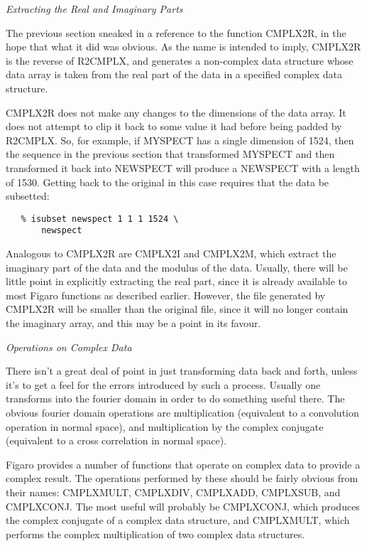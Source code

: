 \goodbreak
\vspace{12pt}
{\it Extracting the Real and Imaginary Parts}

The previous section sneaked in a reference to the function CMPLX2R,
in the hope that what it did was obvious.  As the name is intended to imply,
CMPLX2R is the reverse of R2CMPLX, and generates a non-complex data structure
whose data array is taken from the real part of the data in a specified
complex data structure.

CMPLX2R does not make any changes to the dimensions of the data
array.  It does not attempt to clip it back to some value it had before
being padded by R2CMPLX.  So, for
example, if MYSPECT has a single dimension of 1524, then the sequence
in the previous section that transformed MYSPECT and then transformed it
back into NEWSPECT will produce a NEWSPECT with a length of 1530.
Getting back to the original in this case requires that the data be subsetted:

\begin{verbatim}
   % isubset newspect 1 1 1 1524 \
       newspect
\end{verbatim}

Analogous to CMPLX2R are CMPLX2I and CMPLX2M, which extract the
imaginary part of the data and the modulus of the data.  Usually, there
will be little point in explicitly extracting the real part, since it is
already available to most Figaro functions as described earlier.  However,
the file generated by CMPLX2R will be smaller than the original file, since
it will no longer contain the imaginary array, and this may be
a point in its favour.


\goodbreak
\vspace{12pt}
{\it Operations on Complex Data}

There isn't a great deal of point in just transforming data back and
forth, unless it's to get a feel for the errors introduced by such a 
process.  Usually one transforms into the fourier domain in order to do
something useful there.  The obvious fourier domain operations are
multiplication (equivalent to a convolution operation in normal space),
and multiplication by the complex conjugate (equivalent to a cross
correlation in normal space).

Figaro provides a number of functions that operate on complex data to
provide a complex result.  The operations performed by these should be
fairly obvious from their names: CMPLX\-MULT, CMPLX\-DIV, CMPLX\-ADD,
CMPLX\-SUB, and CMPLX\-CONJ.  The most useful will probably be
CMPLX\-CONJ, which produces the complex conjugate of a complex data
structure, and CMPLX\-MULT, which performs the complex multiplication of
two complex data structures.

